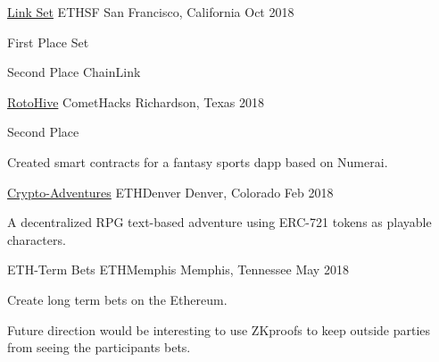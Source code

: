 
\begin{cventries}
	\cventry
	{\href{https://github.com/Emiller88/Link-Set}{Link Set}} %
	{ETHSF} %
	{San Francisco, California} %
	{Oct 2018} %
	{
		\begin{cvitems} %
			\item {First Place Set}
			\item {Second Place ChainLink}
		\end{cvitems}
	}
	\cventry
	{\href{https://github.com/Emiller88/Rotohive}{RotoHive}} %
	{CometHacks} %
	{Richardson, Texas} %
	{2018} %
	{
		\begin{cvitems} %
			\item {Second Place}
			\item {Created smart contracts for a fantasy sports dapp based on Numerai.}
		\end{cvitems}
	}

	\cventry
	{\href{https://github.com/Crypto-Adventures/}{Crypto-Adventures}} %
	{ETHDenver} %
	{Denver, Colorado} %
	{Feb 2018} %
	{
		\begin{cvitems} %
			\item {A decentralized RPG text-based adventure using ERC-721 tokens as playable characters.}
		\end{cvitems}
	}

	\cventry
	{ETH-Term Bets} %
	{ETHMemphis} %
	{Memphis, Tennessee} %
	{May 2018} %
	{
		\begin{cvitems} %
			\item {Create long term bets on the Ethereum.}
			\item {Future direction would be interesting to use ZKproofs to keep outside parties from seeing the participants bets.}
		\end{cvitems}
	}
\end{cventries}
